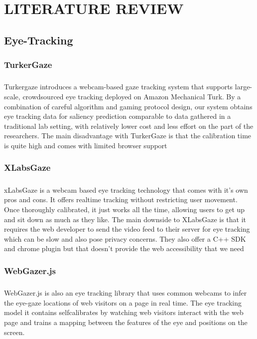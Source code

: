 \documentclass[12pt,a4paper,final]{extreport}
\begin{document}
\newpage
\chapter{LITERATURE REVIEW}
\section{Eye-Tracking}
\subsection{TurkerGaze}
\paragraph{}
Turkergaze introduces a webcam-based gaze tracking system that supports large-scale, crowdsourced eye tracking deployed on Amazon Mechanical Turk. By a combination of careful
algorithm and gaming protocol design, our system obtains eye tracking data for saliency prediction comparable to data gathered in a traditional lab setting, with relatively lower cost and
less effort on the part of the researchers. The main disadvantage with TurkerGaze is that the
calibration time is quite high and comes with limited browser support
\subsection{ XLabsGaze}
\paragraph{}
xLabsGaze is a webcam based eye tracking technology that comes with it’s own pros and cons.
It offers realtime tracking without restricting user movement. Once thoroughly calibrated, it
just works all the time, allowing users to get up and sit down as much as they like. The main
downside to XLabsGaze is that it requires the web developer to send the video feed to their
server for eye tracking which can be slow and also pose privacy concerns. They also offer a
C++ SDK and chrome plugin but that doesn’t provide the web accessibility that we need
\subsection{WebGazer.js}
\paragraph{}
WebGazer.js is also an eye tracking library that uses common webcams to infer the eye-gaze
locations of web visitors on a page in real time. The eye tracking model it contains selfcalibrates by watching web visitors interact with the web page and trains a mapping between
the features of the eye and positions on the screen.
\end{document}
